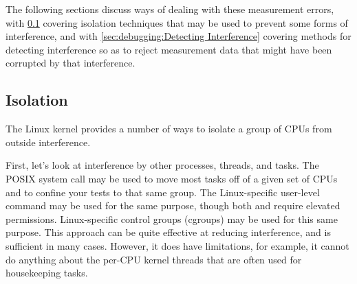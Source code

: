 \QuickQuizEnd

The following sections discuss ways of dealing with these measurement
errors, with
\cref{sec:debugging:Isolation}
covering isolation techniques that may be used to prevent some forms of
interference,
and with
\cref{sec:debugging:Detecting Interference}
covering methods for detecting interference so as to reject measurement
data that might have been corrupted by that interference.

\subsection{Isolation}
\label{sec:debugging:Isolation}

The Linux kernel provides a number of ways to isolate a group of
CPUs from outside interference.

First, let's look at interference by other processes, threads, and tasks.
The POSIX  system call may be used to move
most tasks off of a given set of CPUs and to confine your tests to
that same group.
The Linux-specific user-level  command may be used for
the same purpose, though both  and
 require elevated permissions.
Linux-specific control groups (cgroups) may be used for this same purpose.
This approach can be quite effective at reducing interference, and
is sufficient in many cases.
However, it does have limitations, for example, it cannot do anything
about the per-CPU kernel threads that are often used for housekeeping
tasks.

